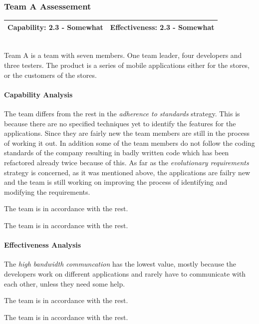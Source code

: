 \subsubsection{Team A Assessement}
\begin{tabular}{| p{6cm} | p{6cm}|}
\hline
\textbf{Capability:} 2.3 - Somewhat & \textbf{Effectiveness:} 2.3 - Somewhat \\ \hline
\end{tabular} \\

Team A is a team with seven members. One team leader, four developers and three testers. The product is a series of mobile applications either for the stores, or the customers of the stores.

\paragraph{Capability Analysis}

The team differs from the rest in the \textit{adherence to standards} strategy. This is because there are no specified techniques yet to identify the features for the applications. Since they are fairly new the team members are still in the process of working it out. In addition some of the team members do not follow the coding standards of the company resulting in badly written code which has been refactored already twice because of this. As far as the \textit{evolutionary requirements} strategy is concerned, as it was mentioned above, the applications are failry new and the team is still working on improving the process of identifying and modifying the requirements.

The team is in accordance with the rest.

The team is in accordance with the rest.

\paragraph{Effectiveness Analysis}

The \textit{high bandwidth communcation} has the lowest value, mostly because the developers work on different applications and rarely have to communicate with each other, unless they need some help.

The team is in accordance with the rest.

The team is in accordance with the rest.


